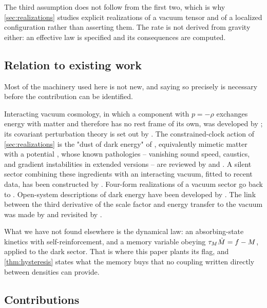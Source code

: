 The third assumption does not follow from the first two, which is why
\cref{sec:realizations} studies explicit realizations of a vacuum tensor and of
a localized configuration rather than asserting them. The rate is not derived
from gravity either: an effective law is specified and its consequences are
computed.

\subsection{Relation to existing work}\label{sec:intro-prior}

Most of the machinery used here is not new, and saying so precisely is
necessary before the contribution can be identified.

Interacting vacuum cosmology, in which a component with $p=-\rho$ exchanges
energy with matter and therefore has no rest frame of its own, was developed by
\textcite{wands2012_12036776}; its covariant perturbation theory is set out by
\textcite{sebastianutti2023_231214123}. The constrained-clock action of
\cref{sec:realizations} is the "dust of dark energy" of
\textcite{lim2010_10035751}, equivalently mimetic matter with a potential
\parencite{chamseddine2014_14033961}, whose known pathologies -- vanishing
sound speed, caustics, and gradient instabilities in extended versions -- are
reviewed by \textcite{sebastiani2016_161208661} and
\textcite{malaeb2026_260214082}. A silent sector combining these ingredients
with an interacting vacuum, fitted to recent data, has been constructed by
\textcite{prez2026_260719494}. Four-form realizations of a vacuum sector go
back to \textcite{bousso2000_hep-th0004134}. Open-system descriptions of dark
energy have been developed by \textcite{salcedo2026_260312321}. The link
between the third derivative of the scale factor and energy transfer to the
vacuum was made by \textcite{szydlowski2005_astro-ph0502034} and revisited by
\textcite{worsley2026_260720348}.

What we have not found elsewhere is the dynamical law: an absorbing-state
kinetics with self-reinforcement, and a memory variable obeying
$\tau_{M}\dot {M}=f-M$, applied to the dark sector. That is where this
paper plants its flag, and \cref{thm:hysteresis} states what the memory buys
that no coupling written directly between densities can provide.

\subsection{Contributions}\label{sec:intro-contributions}

